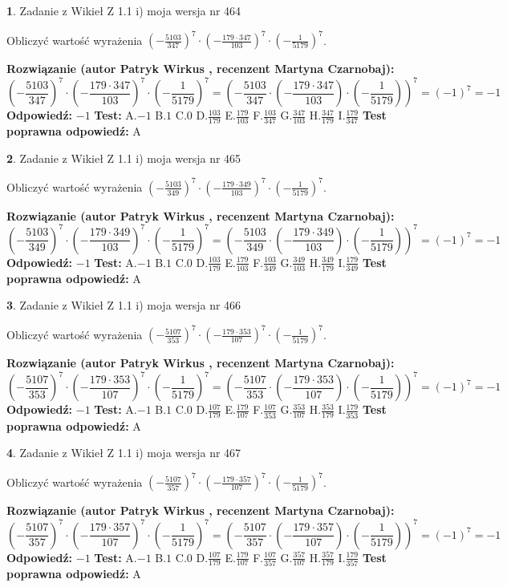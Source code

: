 \documentclass[12pt, a4paper]{article}
\theoremstyle{definition} %
\newtheorem{zad}{}
\newcommand{\zadStart}[1]{\begin{zad}#1\newline}
\newcommand{\zadStop}{\end{zad}}
\newcommand{\rozwStart}[2]{\noindent \textbf{Rozwiązanie (autor #1 , recenzent #2): }\newline}
\newcommand{\rozwStop}{\newline}
\newcommand{\odpStart}{\noindent \textbf{Odpowiedź:}\newline}
\newcommand{\odpStop}{\newline}
\newcommand{\testStart}{\noindent \textbf{Test:}\newline}
\newcommand{\testStop}{\newline}
\newcommand{\kluczStart}{\noindent \textbf{Test poprawna odpowiedź:}\newline}
\newcommand{\kluczStop}{\newline}
\begin{document}
\zadStart{Zadanie z Wikieł Z 1.1 i) moja wersja nr 464}

Obliczyć wartość wyrażenia $(-\frac{5103}{347})^{7} \cdot (-\frac{179 \cdot 347}{103})^{7} \cdot (-\frac{1}{5179})^{7}$.
\zadStop
\rozwStart{Patryk Wirkus}{Martyna Czarnobaj}
$$(-\frac{5103}{347})^{7} \cdot (-\frac{179 \cdot 347}{103})^{7} \cdot (-\frac{1}{5179})^{7} = (-\frac{5103}{347} \cdot (-\frac{179 \cdot 347}{103}) \cdot (-\frac{1}{5179}))^{7} = (-1)^{7} = -1$$
\rozwStop
\odpStart
$-1$
\odpStop
\testStart
A.$-1$ B.$1$ C.$0$ D.$\frac{103}{179}$ E.$\frac{179}{103}$
F.$\frac{103}{347}$ G.$\frac{347}{103}$
H.$\frac{347}{179}$
I.$\frac{179}{347}$
\testStop
\kluczStart
A
\kluczStop



\zadStart{Zadanie z Wikieł Z 1.1 i) moja wersja nr 465}

Obliczyć wartość wyrażenia $(-\frac{5103}{349})^{7} \cdot (-\frac{179 \cdot 349}{103})^{7} \cdot (-\frac{1}{5179})^{7}$.
\zadStop
\rozwStart{Patryk Wirkus}{Martyna Czarnobaj}
$$(-\frac{5103}{349})^{7} \cdot (-\frac{179 \cdot 349}{103})^{7} \cdot (-\frac{1}{5179})^{7} = (-\frac{5103}{349} \cdot (-\frac{179 \cdot 349}{103}) \cdot (-\frac{1}{5179}))^{7} = (-1)^{7} = -1$$
\rozwStop
\odpStart
$-1$
\odpStop
\testStart
A.$-1$ B.$1$ C.$0$ D.$\frac{103}{179}$ E.$\frac{179}{103}$
F.$\frac{103}{349}$ G.$\frac{349}{103}$
H.$\frac{349}{179}$
I.$\frac{179}{349}$
\testStop
\kluczStart
A
\kluczStop



\zadStart{Zadanie z Wikieł Z 1.1 i) moja wersja nr 466}

Obliczyć wartość wyrażenia $(-\frac{5107}{353})^{7} \cdot (-\frac{179 \cdot 353}{107})^{7} \cdot (-\frac{1}{5179})^{7}$.
\zadStop
\rozwStart{Patryk Wirkus}{Martyna Czarnobaj}
$$(-\frac{5107}{353})^{7} \cdot (-\frac{179 \cdot 353}{107})^{7} \cdot (-\frac{1}{5179})^{7} = (-\frac{5107}{353} \cdot (-\frac{179 \cdot 353}{107}) \cdot (-\frac{1}{5179}))^{7} = (-1)^{7} = -1$$
\rozwStop
\odpStart
$-1$
\odpStop
\testStart
A.$-1$ B.$1$ C.$0$ D.$\frac{107}{179}$ E.$\frac{179}{107}$
F.$\frac{107}{353}$ G.$\frac{353}{107}$
H.$\frac{353}{179}$
I.$\frac{179}{353}$
\testStop
\kluczStart
A
\kluczStop



\zadStart{Zadanie z Wikieł Z 1.1 i) moja wersja nr 467}

Obliczyć wartość wyrażenia $(-\frac{5107}{357})^{7} \cdot (-\frac{179 \cdot 357}{107})^{7} \cdot (-\frac{1}{5179})^{7}$.
\zadStop
\rozwStart{Patryk Wirkus}{Martyna Czarnobaj}
$$(-\frac{5107}{357})^{7} \cdot (-\frac{179 \cdot 357}{107})^{7} \cdot (-\frac{1}{5179})^{7} = (-\frac{5107}{357} \cdot (-\frac{179 \cdot 357}{107}) \cdot (-\frac{1}{5179}))^{7} = (-1)^{7} = -1$$
\rozwStop
\odpStart
$-1$
\odpStop
\testStart
A.$-1$ B.$1$ C.$0$ D.$\frac{107}{179}$ E.$\frac{179}{107}$
F.$\frac{107}{357}$ G.$\frac{357}{107}$
H.$\frac{357}{179}$
I.$\frac{179}{357}$
\testStop
\kluczStart
A
\kluczStop
\end{document}

